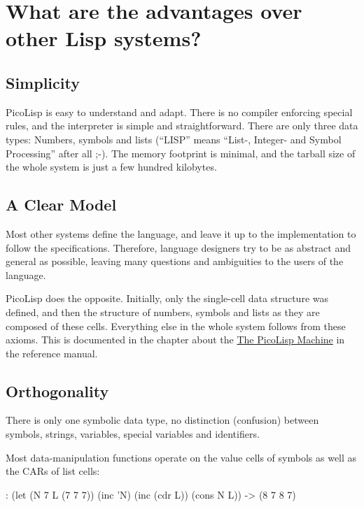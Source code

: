 
\section{What are the advantages over other Lisp systems?}
\label{sec:faq-what-are-the-advantages-over-other-lisp-systems?}
\subsection{Simplicity}
\label{sec:faq-simplicity}


PicoLisp is easy to understand and adapt. There is no compiler enforcing
special rules, and the interpreter is simple and straightforward. There
are only three data types: Numbers, symbols and lists (``LISP'' means
``List-, Integer- and Symbol Processing'' after all ;-). The memory
footprint is minimal, and the tarball size of the whole system is just a
few hundred kilobytes.
\subsection{A Clear Model}
\label{sec:faq-a-clear-model}


Most other systems define the language, and leave it up to the
implementation to follow the specifications. Therefore, language
designers try to be as abstract and general as possible, leaving many
questions and ambiguities to the users of the language.

PicoLisp does the opposite. Initially, only the single-cell data
structure was defined, and then the structure of numbers, symbols and
lists as they are composed of these cells. Everything else in the whole
system follows from these axioms. This is documented in the chapter
about the \hyperref[ref.html-vm]{The PicoLisp Machine} in the reference manual.
\subsection{Orthogonality}
\label{sec:faq-orthogonality}


There is only one symbolic data type, no distinction (confusion) between
symbols, strings, variables, special variables and identifiers.

Most data-manipulation functions operate on the value cells of symbols
as well as the CARs of list cells:


\begin{wideverbatim}
: (let (N 7  L (7 7 7)) (inc 'N) (inc (cdr L)) (cons N L))
-> (8 7 8 7)
\end{wideverbatim}

